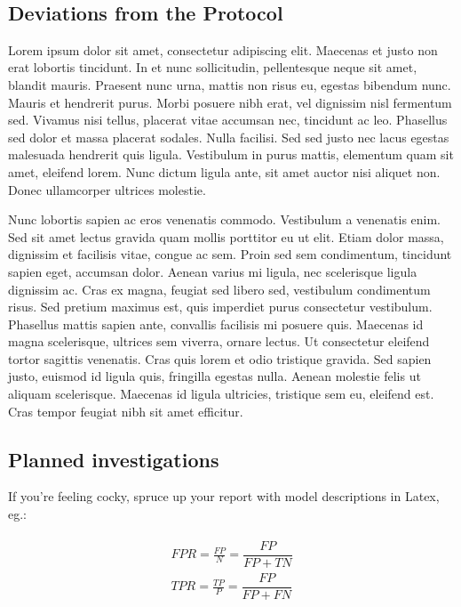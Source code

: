\documentclass[]{elsarticle} %
\begin{document}
\(~\)\\

\hypertarget{deviations-from-the-protocol}{%
\subsection{Deviations from the
Protocol}\label{deviations-from-the-protocol}}

Lorem ipsum dolor sit amet, consectetur adipiscing elit. Maecenas et
justo non erat lobortis tincidunt. In et nunc sollicitudin, pellentesque
neque sit amet, blandit mauris. Praesent nunc urna, mattis non risus eu,
egestas bibendum nunc. Mauris et hendrerit purus. Morbi posuere nibh
erat, vel dignissim nisl fermentum sed. Vivamus nisi tellus, placerat
vitae accumsan nec, tincidunt ac leo. Phasellus sed dolor et massa
placerat sodales. Nulla facilisi. Sed sed justo nec lacus egestas
malesuada hendrerit quis ligula. Vestibulum in purus mattis, elementum
quam sit amet, eleifend lorem. Nunc dictum ligula ante, sit amet auctor
nisi aliquet non. Donec ullamcorper ultrices molestie.

Nunc lobortis sapien ac eros venenatis commodo. Vestibulum a venenatis
enim. Sed sit amet lectus gravida quam mollis porttitor eu ut elit.
Etiam dolor massa, dignissim et facilisis vitae, congue ac sem. Proin
sed sem condimentum, tincidunt sapien eget, accumsan dolor. Aenean
varius mi ligula, nec scelerisque ligula dignissim ac. Cras ex magna,
feugiat sed libero sed, vestibulum condimentum risus. Sed pretium
maximus est, quis imperdiet purus consectetur vestibulum. Phasellus
mattis sapien ante, convallis facilisis mi posuere quis. Maecenas id
magna scelerisque, ultrices sem viverra, ornare lectus. Ut consectetur
eleifend tortor sagittis venenatis. Cras quis lorem et odio tristique
gravida. Sed sapien justo, euismod id ligula quis, fringilla egestas
nulla. Aenean molestie felis ut aliquam scelerisque. Maecenas id ligula
ultricies, tristique sem eu, eleifend est. Cras tempor feugiat nibh sit
amet efficitur.

\hypertarget{planned-investigations}{%
\subsection{Planned investigations}\label{planned-investigations}}

If you're feeling cocky, spruce up your report with model descriptions
in Latex, eg.:

\begin{align}
\begin{aligned}
FPR = \frac{FP}{N} = \dfrac{FP}{FP+TN}\\
TPR = \frac{TP}{P} = \dfrac{FP}{FP+FN}
\end{aligned}
\end{align}
\end{document}

